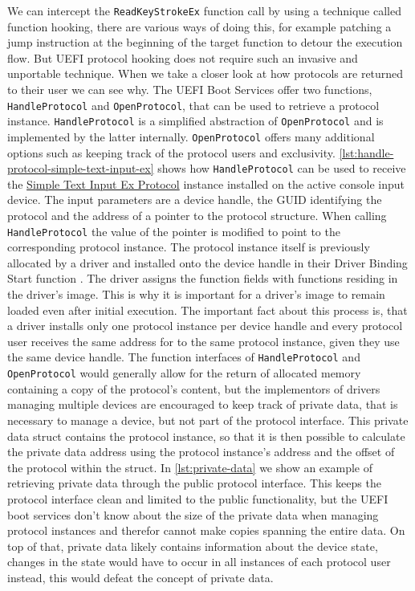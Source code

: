 We can intercept the \lstinline{ReadKeyStrokeEx} function call by using a technique called function hooking, there are various ways of doing this, for example patching a jump instruction at the beginning of the target function to detour the execution flow.
But \ac{UEFI} protocol hooking does not require such an invasive and unportable technique.
When we take a closer look at how protocols are returned to their user we can see why.
The \ac{UEFI} Boot Services offer two functions, \lstinline{HandleProtocol} and \lstinline{OpenProtocol}, that can be used to retrieve a protocol instance. \lstinline{HandleProtocol} is a simplified abstraction of \lstinline{OpenProtocol} and is implemented by the latter internally.
\lstinline{OpenProtocol} offers many additional options such as keeping track of the protocol users and exclusivity\cite[7.3]{uefi-spec}.
\autoref{lst:handle-protocol-simple-text-input-ex} shows how \lstinline{HandleProtocol} can be used to receive the \hyperref[lst:simple-text-input-ex-protocol]{Simple Text Input Ex Protocol} instance installed on the active console input device\cite[4.3]{uefi-spec}.
The input parameters are a device handle, the \ac{GUID} identifying the protocol and the address of a pointer to the protocol structure.
When calling \lstinline{HandleProtocol} the value of the pointer is modified to point to the corresponding protocol instance.
The protocol instance itself is previously allocated by a driver and installed onto the device handle in their Driver Binding Start function .
The driver assigns the function fields with functions residing in the driver's image.
This is why it is important for a driver's image to remain loaded even after initial execution.
The important fact about this process is, that a driver installs only one protocol instance per device handle and every protocol user receives the same address for to the same protocol instance, given they use the same device handle.
The function interfaces of \lstinline{HandleProtocol} and \lstinline{OpenProtocol} would generally allow for the return of allocated memory containing a copy of the protocol's content, but the implementors of drivers managing multiple devices are encouraged to keep track of private data, that is necessary to manage a device, but not part of the protocol interface.
This private data struct contains the protocol instance, so that it is then possible to calculate the private data address using the protocol instance's address and the offset of the protocol within the struct\cite[8]{tianocore-edk2-driver-writer-s-guide}.
In \autoref{lst:private-data} we show an example of retrieving private data through the public protocol interface.
This keeps the protocol interface clean and limited to the public functionality, but the \ac{UEFI} boot services don't know about the size of the private data when managing protocol instances and therefor cannot make copies spanning the entire data.
On top of that, private data likely contains information about the device state, changes in the state would have to occur in all instances of each protocol user instead, this would defeat the concept of private data.

